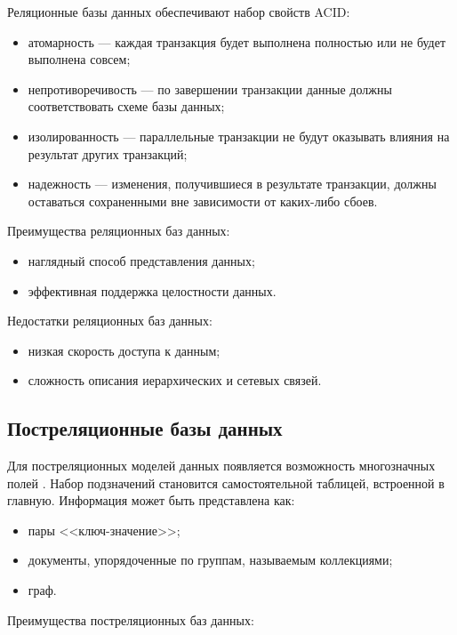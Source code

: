 Реляционные базы данных обеспечивают набор свойств ACID:

\begin{itemize}
	\item атомарность --- каждая транзакция будет выполнена полностью или не будет выполнена совсем;
	\item непротиворечивость --- по завершении транзакции данные должны соответствовать схеме базы данных;
	\item изолированность --- параллельные транзакции не будут оказывать влияния на результат других транзакций;
	\item надежность --- изменения, получившиеся в результате транзакции, должны оставаться сохраненными вне зависимости от каких-либо сбоев.
\end{itemize}

Преимущества реляционных баз данных:

\begin{itemize}
	\item наглядный способ представления данных;
	\item эффективная поддержка целостности данных.
\end{itemize}

Недостатки реляционных баз данных:

\begin{itemize}
	\item низкая скорость доступа к данным;
	\item сложность описания иерархических и сетевых связей.
\end{itemize}

\subsection{Постреляционные базы данных}

Для постреляционных моделей данных появляется возможность многозначных полей \cite{after}. Набор подзначений становится самостоятельной таблицей, встроенной в главную. Информация может быть представлена как:

\begin{itemize}
	\item пары <<ключ-значение>>;
	\item документы, упорядоченные по группам, называемым коллекциями;
	\item граф.
\end{itemize}

Преимущества постреляционных баз данных:

